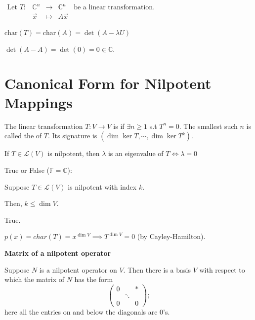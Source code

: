 \documentclass[11pt,fleqn]{book} %
\begin{document}
\begin{example}
{~~~}

    $\begin{matrix}\text{Let } T: &\mathbb{C}^n &\to &\mathbb{C}^n &\text{be a linear transformation. }\\ &\vec{x} &\mapsto &A\vec{x} \end{matrix}$

    $\mathrm{char}(T) = \mathrm{char}(A) = \det(A - \lambda U)$

    $\det(A - A) = \det(0) = 0 \in \mathbb{C}$.
\end{example}

\section{Canonical Form for Nilpotent Mappings}
\setcounter{section}{0}
\setcounter{definitionT}{2}
\begin{definition}[Niplotent]
    The linear transformation $T: V \to V$ is  if $\exists n \ge 1$ s.t $T^n = 0$. The smallest such $n$ is called the  of $T$. Its signature is $(\dim \ker T, \cdots, \dim\ker T^k)$.
\end{definition}

 If $T \in \mathcal{L}(V)$ is nilpotent, then $\lambda$ is an eigenvalue of $T \iff \lambda = 0$

\begin{example}
    True or False ($\mathbb{F} = \mathbb{C}$):

    Suppose $T \in \mathcal{L}(V)$ is nilpotent with index $k$.

    Then, $k \le \dim V$.

    {\color{lightblue} True.

    $p(x) = char(T) = x^{\dim V} \implies T^{\dim V} = 0$ (by Cayley-Hamilton). }
\end{example}

\textbf{Matrix of a nilpotent operator}

Suppose $N$ is a nilpotent operator on $V$. Then there is a basis $V$ with respect to which the matrix of $N$ has the form $$\begin{pmatrix} 0 & &* \\ &\ddots \\0 & &0 \end{pmatrix};$$ here all the entries on and below the diagonals are $0$'s.
\end{document}
